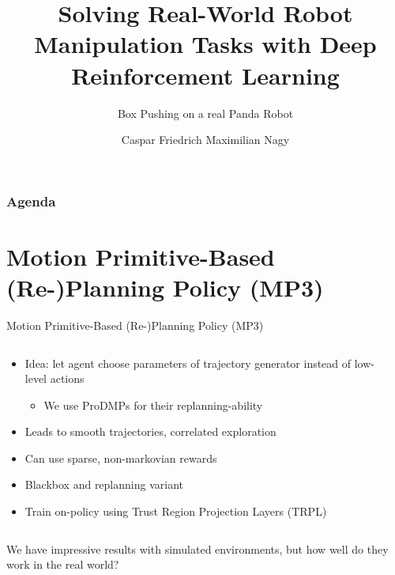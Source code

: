 \documentclass[16:9,en,navbarinfooter]{sdqbeamer}
\author{Caspar Friedrich Maximilian Nagy}
\title{Solving Real-World Robot Manipulation Tasks with Deep Reinforcement Learning}
\subtitle{Box Pushing on a real Panda Robot}
\begin{document}
\KITtitleframe{}


\begin{frame}
\frametitle{Agenda}
\tableofcontents
\end{frame}

\section{Motion Primitive-Based (Re-)Planning Policy (MP3)}
\begin{frame}{Motion Primitive-Based (Re-)Planning Policy (MP3)}

\begin{columns}[t]
    \begin{column}{\textwidth}
        \begin{itemize}
            \item Idea: let agent choose parameters of trajectory generator instead of low-level actions
                \begin{itemize}
                    \item We use ProDMPs for their replanning-ability
                \end{itemize}
            \item Leads to smooth trajectories, correlated exploration
            \item Can use sparse, non-markovian rewards
            \item Blackbox and replanning variant
            \item Train on-policy using Trust Region Projection Layers (TRPL)
        \end{itemize}
    \end{column}
    \begin{column}{0.5\textwidth}
    \end{column}
\end{columns}
\vspace{1cm}
     We have impressive results with simulated environments, but how well do they work in the real world?
\end{frame}
\end{document}
